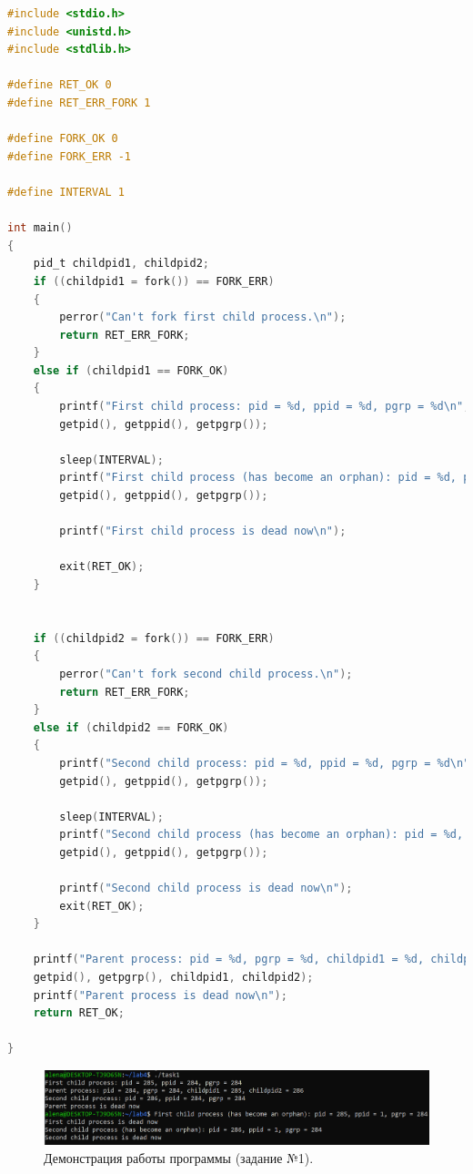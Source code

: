 \documentclass[12pt]{report}
\begin{document}
\begin{lstlisting}[label=some-code,caption=Код программы к заданию №1,language=C]
#include <stdio.h>
#include <unistd.h>
#include <stdlib.h>

#define RET_OK 0
#define RET_ERR_FORK 1

#define FORK_OK 0
#define FORK_ERR -1

#define INTERVAL 1

int main()
{
	pid_t childpid1, childpid2;
	if ((childpid1 = fork()) == FORK_ERR)
	{
		perror("Can't fork first child process.\n");
		return RET_ERR_FORK;
	}
	else if (childpid1 == FORK_OK)
	{
		printf("First child process: pid = %d, ppid = %d, pgrp = %d\n", 
		getpid(), getppid(), getpgrp());
		
		sleep(INTERVAL);
		printf("First child process (has become an orphan): pid = %d, ppid = %d, pgrp = %d\n", 
		getpid(), getppid(), getpgrp());
		
		printf("First child process is dead now\n");
		
		exit(RET_OK);
	}
	
	
	if ((childpid2 = fork()) == FORK_ERR)
	{
		perror("Can't fork second child process.\n");
		return RET_ERR_FORK;
	}
	else if (childpid2 == FORK_OK)
	{
		printf("Second child process: pid = %d, ppid = %d, pgrp = %d\n", 
		getpid(), getppid(), getpgrp());
		
		sleep(INTERVAL);
		printf("Second child process (has become an orphan): pid = %d, ppid = %d, pgrp = %d\n", 
		getpid(), getppid(), getpgrp());
		
		printf("Second child process is dead now\n");
		exit(RET_OK);
	}
	
	printf("Parent process: pid = %d, pgrp = %d, childpid1 = %d, childpid2 = %d\n", 
	getpid(), getpgrp(), childpid1, childpid2);
	printf("Parent process is dead now\n");
	return RET_OK;
	
}
\end{lstlisting}

\begin{figure}[H]

	\centering

	\includegraphics[width=\linewidth]{img/task01.png}
	\caption{Демонстрация работы программы (задание №1).}

	\label{fig:task01}

\end{figure}
\end{document}
